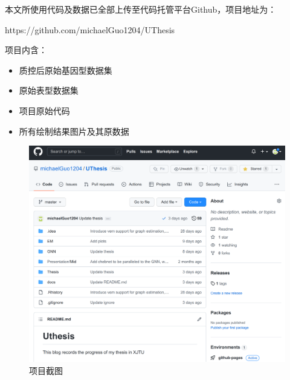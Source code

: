 

本文所使用代码及数据已全部上传至代码托管平台Github，项目地址为：

https://github.com/michaelGuo1204/UThesis

项目内含：
\begin{itemize}
	\item 质控后原始基因型数据集
	\item 原始表型数据集
	\item 项目原始代码
	\item 所有绘制结果图片及其原数据
\end{itemize}

\begin{figure}[!ht]
	\centering
	\includegraphics[width=\textwidth]{./figures/Appendix/github.png}
	\caption{项目截图}
    \label{fig:github}
\end{figure}